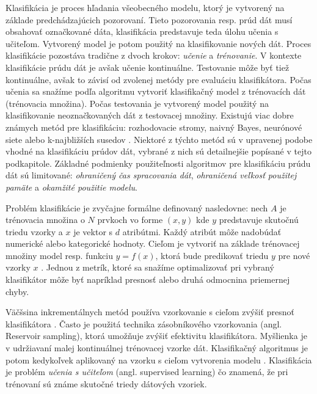 \par
Klasifikácia je proces hľadania všeobecného modelu, ktorý je vytvorený na základe predchádzajúcich pozorovaní. Tieto pozorovania resp. prúd dát musí obsahovať označkované dáta, klasifikácia predstavuje teda úlohu učenia s učiteľom. Vytvorený model je potom použitý na klasifikovanie nových dát. Proces klasifikácie pozostáva tradične z dvoch krokov: \textit{učenie} a \textit{trénovanie}. V kontexte klasifikácie prúdu dát je avšak učenie kontinuálne. Testovanie môže byť tiež kontinuálne, avšak to závisí od zvolenej metódy pre evaluáciu klasifikátora. Počas učenia sa snažíme podľa algoritmu vytvoriť klasifikačný model z trénovacích dát (trénovacia množina). Počas testovania je vytvorený model použitý na klasifikovanie neoznačkovaných dát z testovacej množiny. Existujú viac dobre známych metód pre klasifikáciu: rozhodovacie stromy, naivný Bayes, neurónové siete alebo k-najbližších susedov \citep{nguyen2015survey}. Niektoré z týchto metód sú v upravenej podobe vhodné na klasifikáciu prúdov dát, vybrané z nich sú detailnejšie popísané v tejto podkapitole. Základné podmienky použiteľnosti algoritmov pre klasifikáciu prúdu dát sú limitované: \textit{ohraničený čas spracovania dát}, \textit{ohraničená veľkosť použitej pamäte} a \textit{okamžité použitie modelu}.
\par
Problém klasifikácie je zvyčajne formálne definovaný nasledovne: nech $A$ je trénovacia množina o $N$ prvkoch vo forme $(x,y)$ kde $y$ predstavuje skutočnú triedu vzorky a $x$ je vektor s $d$ atribútmi. Každý atribút môže nadobúdať numerické alebo kategorické hodnoty. Cieľom je vytvoriť na základe trénovacej množiny model resp. funkciu $y=f(x)$, ktorá bude predikovať triedu $y$ pre nové vzorky $x$ \citep{domingos2000mining}. Jednou z metrík, ktoré sa snažíme optimalizovať pri vybraný klasifikátor môže byť napríklad presnosť alebo druhá odmocnina priemernej chyby.
\par
Väčšsina inkrementálnych metód používa vzorkovanie s cieľom zvýšiť presnoť klasifikátora \citep{aggarwal2014survey, nguyen2015survey}. Často je použitá technika zásobníkového vzorkovania (angl. Reservoir sampling), ktorá umožňuje zvýšiť efektivitu klasifikátora. Myšlienka je v udržiavaní malej kontinuálnej trénovacej vzorke dát. Klasifikačný algoritmus je potom kedykoľvek aplikovaný na vzorku s cieľom vytvorenia modelu \citep{aggarwal2014survey}. Klasifikácia je problém \textit{učenia s učiteľom} (angl. supervised learning) čo znamená, že pri trénovaní sú známe skutočné triedy dátových vzoriek.

